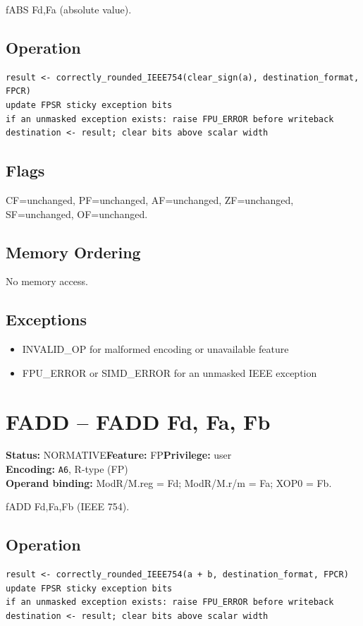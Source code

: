 \documentclass[10pt]{article}
\begin{document}
fABS Fd,Fa (absolute value).

\subsection*{Operation}
\begin{lstlisting}
result <- correctly_rounded_IEEE754(clear_sign(a), destination_format, FPCR)
update FPSR sticky exception bits
if an unmasked exception exists: raise FPU_ERROR before writeback
destination <- result; clear bits above scalar width
\end{lstlisting}
\subsection*{Flags}
CF=unchanged, PF=unchanged, AF=unchanged, ZF=unchanged, SF=unchanged, OF=unchanged.
\subsection*{Memory Ordering}
No memory access.
\subsection*{Exceptions}
\begin{itemize}
\item INVALID\_OP for malformed encoding or unavailable feature
\item FPU\_ERROR or SIMD\_ERROR for an unmasked IEEE exception
\end{itemize}
\clearpage

\section{FADD -- FADD Fd, Fa, Fb}
\textbf{Status:} NORMATIVE\quad \textbf{Feature:} FP\quad \textbf{Privilege:} user\\
\textbf{Encoding:} \texttt{A6}, R-type (FP)\\
\textbf{Operand binding:} ModR/M.reg = Fd; ModR/M.r/m = Fa; XOP0 = Fb.

fADD Fd,Fa,Fb (IEEE 754).

\subsection*{Operation}
\begin{lstlisting}
result <- correctly_rounded_IEEE754(a + b, destination_format, FPCR)
update FPSR sticky exception bits
if an unmasked exception exists: raise FPU_ERROR before writeback
destination <- result; clear bits above scalar width
\end{lstlisting}
\end{document}
